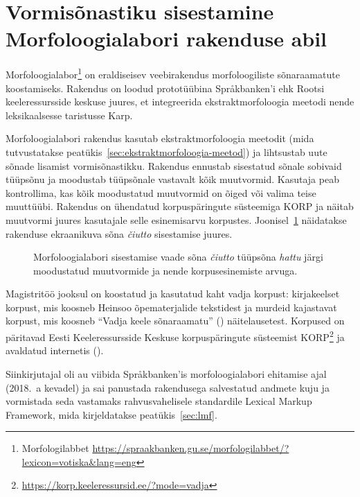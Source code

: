 \documentclass[12pt,a4paper]{article}
\newcommand{\vadja}[1]{\textit{#1}}
\begin{document}
\newpage

\section{Vormisõnastiku sisestamine Morfoloogialabori rakenduse abil}
\label{sec:vormisõnastiku-sisestamine}

Morfoloogialabor\footnote{Morfologilabbet \url{https://spraakbanken.gu.se/morfologilabbet/?lexicon=votiska&lang=eng}} on eraldiseisev veebi\-rakendus morfoloogiliste sõnaraamatute koostamiseks. Rakendus on loodud prototüübina Språkbanken'i ehk Rootsi keele\-ressursside keskuse juures, et integreerida ekstrakt\-morfoloogia meetodi nende leksikaalsesse taristusse Karp.

Morfoloogialabori rakendus kasutab ekstraktmorfoloogia meetodit (mida tutvustatakse peatükis~\ref{sec:ekstraktmorfoloogia-meetod}) ja lihtsustab uute sõnade lisamist vormisõnastikku. Rakendus ennustab sisestatud sõnale sobivaid tüüpsõnu ja moodustab tüüpsõnale vastavalt kõik muutvormid. Kasutaja peab kontrollima, kas kõik moodustatud muutvormid on õiged või valima teise muuttüübi.  Rakendus on ühendatud korpuspäringute süsteemiga KORP ja näitab muutvormi juures kasutajale selle esinemis\-arvu korpustes. Joonisel~\ref{fig:morfologilabbet} näidatakse rakenduse ekraani\-kuva sõna \vadja{čiutto} sisestamise juures.

\begin{figure}[h]
  \center
  \setlength{\fboxsep}{0pt}
  \caption{Morfoloogialabori sisestamise vaade sõna \vadja{čiutto} tüüpsõna \vadja{hattu} järgi moodustatud muutvormide ja nende korpus\-esinemiste arvuga.}
  \label{fig:morfologilabbet}
\end{figure}

Magistritöö jooksul on koostatud ja kasutatud kaht vadja korpust: kirjakeelset korpust, mis koosneb Heinsoo õpematerjalide tekstidest ja murdeid kajastavat korpust, mis koosneb \enquote{Vadja keele sõnaraamatu} (\cite{grunberg_vadja_2013}) näitelausetest. Korpused on päritavad Eesti Keeleressursside Keskuse korpuspäringute süsteemist KORP\footnote{\url{https://korp.keeleressursid.ee/?mode=vadja}} ja avaldatud internetis (\cite{kankainen_keeleleek/votic-corpora:_2018}).

Siin\-kirjutajal oli au viibida Språkbanken'is morfoloogia\-labori ehitamise ajal (2018.~a kevadel) ja sai panustada rakendusega salvestatud andmete kuju ja vormistada seda vastamaks rahvus\-vahelisele standardile Lexical Markup Framework, mida kirjeldatakse peatükis~\ref{sec:lmf}.
\end{document}
